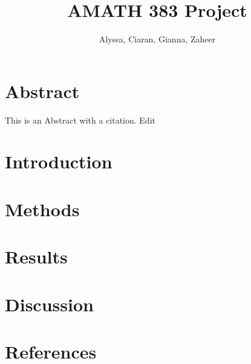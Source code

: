 \documentclass{article}
\title{AMATH 383 Project}
\author{Alyssa, Ciaran, Gianna, Zaheer}
\begin{document}
    \maketitle
    

    \section{Abstract}
    This is an Abstract with a citation\cite{gonzalez-bailon_dynamics_2011}. Edit
    \section{Introduction}
    \section{Methods}
    \section{Results}
    \section{Discussion}
    \section{References}
    
    
    
\end{document}
